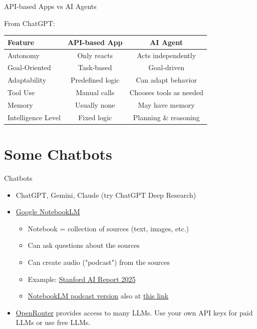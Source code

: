 \documentclass[10pt]{beamer}
\newcommand{\cmark}{\textcolor{green!70!black}{\ding{51}}} %
\newcommand{\xmark}{\textcolor{red}{\ding{55}}}             %
\begin{document}
   

    \begin{frame}{API-based Apps vs AI Agents}

        From ChatGPT:

        \begin{table}[h!]
        \centering
        \renewcommand{\arraystretch}{1.3}
        \begin{tabular}{|l|c|c|}
        \hline
        \textbf{Feature} & \textbf{API-based App} & \textbf{AI Agent} \\
        \hline
        Autonomy & \xmark{} Only reacts & \cmark{} Acts independently \\
        Goal-Oriented & \xmark{} Task-based & \cmark{} Goal-driven \\
        Adaptability & \xmark{} Predefined logic & \cmark{} Can adapt behavior \\
        Tool Use & \cmark{} Manual calls & \cmark{} Chooses tools as needed \\
        Memory & \xmark{} Usually none & \cmark{} May have memory \\
        Intelligence Level & \xmark{} Fixed logic & \cmark{} Planning \& reasoning \\
        \hline
        \end{tabular}
        \end{table}
        \end{frame}

\section{Some Chatbots}

\begin{frame}{Chatbots}
    \begin{itemize}
     \item ChatGPT, Gemini, Claude (try ChatGPT Deep Research)
    \item \href{https://notebooklm.google/}{Google NotebookLM}
    \begin{itemize}
        \item Notebook = collection of sources (text, images, etc.)
        \item Can ask questions about the sources
        \item Can create audio ("podcast") from the sources
    \item Example: \href{https://hai.stanford.edu/ai-index/2025-ai-index-report}{Stanford AI Report 2025}
    \item \href{https://notebooklm.google.com/notebook/83e22c17-71bf-4bb2-a803-294ffe11d365/audio}{NotebookLM podcast version} also at \href{https://www.dropbox.com/scl/fi/ui3b7et1mi575b947n11s/Stanford_AI_Report_2025.wav?rlkey=dpfb7i75uk1yhecn668bzwp2w&dl=1}{this link}
    \end{itemize}
    \item \href{https://openrouter.ai/}{OpenRouter} provides access to many LLMs.  Use your own API keys for paid LLMs or use free LLMs.
        \end{itemize}
    \end{frame}
\end{document}
